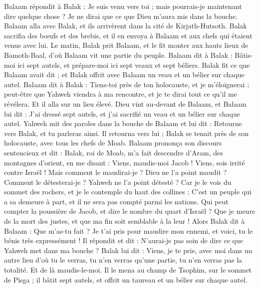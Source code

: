 \begin{multicols}{2}
Balaam répondit à Balak : Je suis venu vers toi ; mais pourrais-je maintenant dire quelque chose ? Je ne dirai que ce que Dieu m'aura mis dans la bouche.
Balaam alla avec Balak, et ils arrivèrent dans la cité de Kirjath-Hutsoth.
Balak sacrifia des bœufs et des brebis, et il en envoya à Balaam et aux chefs qui étaient venus avec lui.
Le matin, Balak prit Balaam, et le fit monter aux hauts lieux de Bamoth-Baal, d’où Balaam vit une partie du peuple.
\VerseOne{}Balaam dit à Balak : Bâtis-moi ici sept autels, et prépare-moi ici sept veaux et sept béliers.
Balak fit ce que Balaam avait dit ; et Balak offrit avec Balaam un veau et un bélier sur chaque autel.
Balaam dit à Balak : Tiens-toi près de ton holocauste, et je m’éloignerai ; peut-être que Yahweh viendra à ma rencontre, et je te dirai tout ce qu'il me révélera. Et il alla sur un lieu élevé.
Dieu vint au-devant de Balaam, et Balaam lui dit : J'ai dressé sept autels, et j'ai sacrifié un veau et un bélier sur chaque autel.
Yahweh mit des paroles dans la bouche de Balaam et lui dit : Retourne vers Balak, et tu parleras ainsi.
Il retourna vers lui ; Balak se tenait près de son holocauste, avec tous les chefs de Moab.
Balaam prononça son discours sentencieux et dit : Balak, roi de Moab, m'a fait descendre d'Aram, des montagnes d'orient, en me disant : Viens, maudis-moi Jacob ! Viens, sois irrité contre Israël !
Mais comment le maudirai-je ? Dieu ne l’a point maudit ?  Comment le détesterai-je ? Yahweh ne l’a point détesté ?
Car je le vois du sommet des rochers, et je le contemple du haut des collines : C’est un peuple qui a sa demeure à part, et il ne sera pas compté parmi les nations.
Qui peut compter la poussière de Jacob, et dire le nombre du quart d'Israël ? Que je meure de la mort des justes, et que ma fin soit semblable à la leur !
Alors Balak dit à Balaam : Que m'as-tu fait ? Je t'ai pris pour maudire mon ennemi, et voici, tu le bénis très expressément !
Il répondit et dit : N’aurai-je pas soin de dire ce que Yahweh met dans ma bouche ?
Balak lui dit : Viens, je te prie, avec moi dans un autre lieu d'où tu le verras, tu n’en verras qu’une partie, tu n’en verras pas la totalité. Et de là maudis-le-moi.
Il le mena au champ de Tsophim, sur le sommet de Pisga ; il bâtit sept autels, et offrit un taureau et un bélier sur chaque autel.

\end{multicols}
